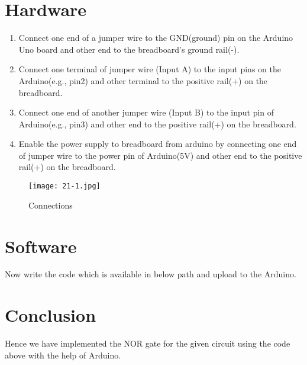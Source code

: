 \documentclass[10pt,a4paper]{article}
\begin{document}
	\section{Hardware}
	\begin{enumerate}
		\item Connect one end of a jumper wire to the GND(ground) pin on the Arduino Uno board and other end to the breadboard's ground rail(-).
		\item Connect one terminal of jumper wire (Input A) to the input pins on the Arduino(e.g., pin2) and other terminal to the positive rail(+) on the breadboard.
		\item Connect one end of another jumper wire (Input B) to the input pin of Arduino(e.g., pin3) and other end to the positive rail(+) on the breadboard.
		\item Enable the power supply to breadboard from arduino by connecting one end of jumper wire to the power pin of Arduino(5V) and other end to the positive rail(+) on the breadboard.
	\end{enumerate}
	\begin{figure}[!h]
		\centering
		\texttt{[image: 21-1.jpg]}
		\caption{Connections}
		\label{fig:connections}
	\end{figure}
	\section{Software}
	Now write the code which is available in below path and upload to the Arduino. \\
	\section{Conclusion}
	Hence we have implemented the NOR gate for the given circuit using the code above with the help of Arduino.
\end{document}
